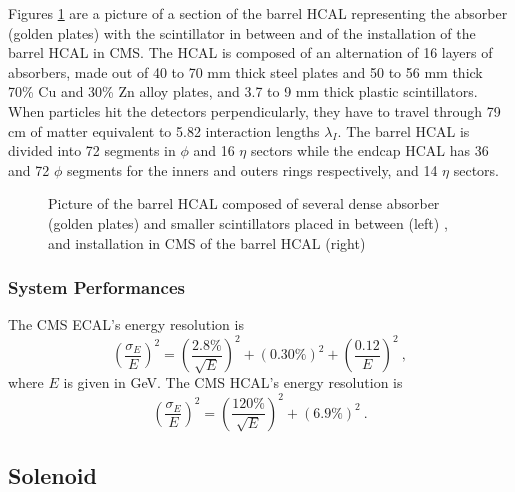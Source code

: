 				Figures \ref{fig:lhc_and_cms__cms_hcal_view} are a picture of a section of the barrel HCAL representing the absorber (golden plates) with the scintillator in between and of the installation of the barrel HCAL in CMS. The HCAL is composed of an alternation of 16 layers of absorbers, made out of 40 to 70 mm thick steel plates and 50 to 56 mm thick 70\% Cu and 30\% Zn alloy plates, and 3.7 to 9 mm thick plastic scintillators. When particles hit the detectors perpendicularly, they have to travel through 79 cm of matter equivalent to 5.82 interaction lengths $ \lambda_I $. The barrel HCAL is divided into 72 segments in $ \phi $ and 16 $ \eta $ sectors while the endcap HCAL has 36 and 72 $ \phi $ segments for the inners and outers rings respectively, and 14 $ \eta $ sectors.

				\begin{figure}[h!]
					\centering
					\caption{Picture of the barrel HCAL composed of several dense absorber (golden plates) and smaller scintillators placed in between (left) \Cite{CMS_at_LHC}, and installation in CMS of the barrel HCAL (right) \Cite{CMS_HCAL_Install}}
					\label{fig:lhc_and_cms__cms_hcal_view}
				\end{figure}

			\subsubsection{System Performances}
			\label{sec:lhc_and_cms__calorimeters_system_performances}

				The CMS ECAL's energy resolution is \Cite{CMS_Performances}
				\begin{equation}
					\left( \frac{\sigma_E}{E} \right)^2 = \left( \frac{2.8\%}{\sqrt{E}} \right)^2 + \left( 0.30\% \right)^2 + \left( \frac{0.12}{E} \right)^2 \ ,
				\end{equation}
				where $ E $ is given in GeV. The CMS HCAL's energy resolution is
				\begin{equation}
					\left( \frac{\sigma_E}{E} \right)^2 = \left( \frac{120\%}{\sqrt{E}} \right)^2 + \left( 6.9\% \right)^2 \ .
				\end{equation}

		\subsection{Solenoid}
		\label{sec:lhc_and_cms__solenoid}

